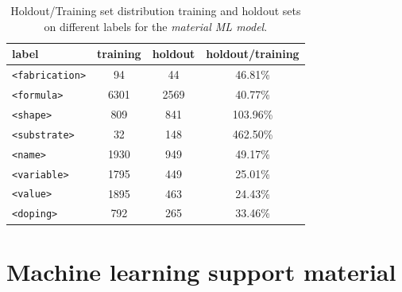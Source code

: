 \documentclass[]{interact}
\theoremstyle{plain}%
\theoremstyle{definition}
\theoremstyle{remark}
\begin{document}
\begin{table}[ht]
    \centering\small
    \begin{tabular}{lccc}
        \toprule
        label                  & \textbf{training} & \textbf{holdout} & \textbf{holdout/training } \\
        \midrule
        \texttt{<fabrication>} & 94                & 44               & 46.81\%                    \\
        \texttt{<formula>}     & 6301              & 2569             & 40.77\%                    \\
        \texttt{<shape>}       & 809               & 841              & 103.96\%                   \\
        \texttt{<substrate>}   & 32                & 148              & 462.50\%                   \\
        \texttt{<name>}        & 1930              & 949              & 49.17\%                    \\
        \texttt{<variable>}    & 1795              & 449              & 25.01\%                    \\
        \texttt{<value>}       & 1895              & 463              & 24.43\%                    \\
        \texttt{<doping>}      & 792               & 265              & 33.46\%                    \\
        \bottomrule
    \end{tabular}

    \caption{Holdout/Training set distribution training and holdout sets on different labels for the \textit{material ML model}.}
    \label{tab:training-holdout-labels-material-distribution-annex}
\end{table}


\section{Machine learning support material}
\end{document}
